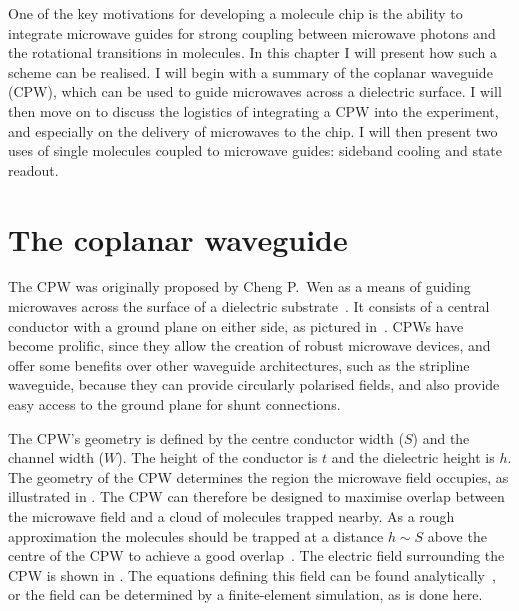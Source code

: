 One of the key motivations for developing a molecule chip is the ability to
integrate microwave guides for strong coupling between microwave photons and
the rotational transitions in molecules. In this chapter I will present how
such a scheme can be realised.  I will begin with a summary of the coplanar
waveguide (CPW), which can be used to guide microwaves across a dielectric
surface. I will then move on to discuss the logistics of integrating a CPW into
the experiment, and especially on the delivery of microwaves to the chip. I
will then present two uses of single \CaF{} molecules coupled to microwave
guides: sideband cooling and state readout.

\section{The coplanar waveguide}

The CPW was originally proposed by Cheng P.~Wen as a means
of guiding microwaves across the surface of a dielectric
substrate~\cite{1127105}. It consists of a central conductor with a ground
plane on either side, as pictured in~. CPWs have become
prolific, since they allow the creation of robust microwave devices, and offer
some benefits over other waveguide architectures, such as the stripline
waveguide, because they can provide circularly polarised fields, and also
provide easy access to the ground plane for shunt connections.

The CPW's geometry is defined by the centre conductor width ($S$) and the
channel width ($W$). The height of the conductor is $t$ and the dielectric
height is $h$.  The geometry of the CPW determines the region the microwave
field occupies, as illustrated in .  The CPW
can therefore be designed to maximise overlap between the microwave field and a
cloud of molecules trapped nearby.  As a rough approximation the molecules
should be trapped at a distance $h\sim S$ above the centre of the CPW to
achieve a good overlap~\cite{Boehi2009}. The electric field surrounding the CPW is shown
in . The equations defining this field can be found
analytically~\cite{Simons2004}, or the field can be determined by a
finite-element simulation, as is done here.

